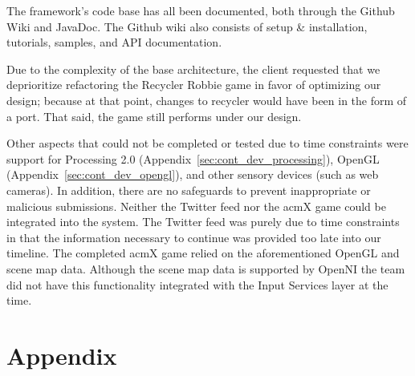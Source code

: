 \documentclass[11pt,letterpaper]{article}
\begin{document}
	The framework's code base has all been documented, both through the Github 
	Wiki and JavaDoc. The Github wiki also consists of setup \& installation, 
	tutorials, samples, and API documentation.

	Due to the complexity of the base architecture, the client requested that 
	we deprioritize refactoring the Recycler Robbie game in favor of 
	optimizing our design; because at that point, changes to recycler would 
	have been in the form of a port. That said, the game still performs under 
	our design. 

	Other aspects that could not be completed or tested due to time 
	constraints were support for Processing 2.0
	(Appendix~\ref{sec:cont_dev_processing}), OpenGL
	(Appendix~\ref{sec:cont_dev_opengl}), and other sensory 
	devices (such as web cameras). In addition, there are no safeguards to prevent 
	inappropriate or malicious submissions. Neither the Twitter feed nor the 
	acmX game could be integrated into the system. The Twitter feed was purely 
	due to time constraints in that the information necessary to continue was 
	provided too late into our timeline. The completed acmX game relied on the
	aforementioned OpenGL and scene map data.  Although the scene map data is
	supported by OpenNI the team did not have this functionality integrated with
	the Input Services layer at the time.

	\pagebreak

	\appendix
	\section*{Appendix}
	\renewcommand{\thesubsection}{\Alph{subsection}}
   
\end{document}
